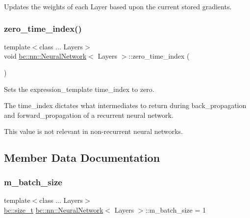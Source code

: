 Updates the weights of each Layer based upon the current stored gradients. 

\mbox{\label{structbc_1_1nn_1_1NeuralNetwork_aead05a9cd78bf9f495c0bcd6ea723bd6}} 
\subsubsection{\texorpdfstring{zero\+\_\+time\+\_\+index()}{zero\_time\_index()}}
{\footnotesize\ttfamily template$<$class ... Layers$>$ \\
void \hyperlink{structbc_1_1nn_1_1NeuralNetwork}{bc\+::nn\+::\+Neural\+Network}$<$ Layers $>$\+::zero\+\_\+time\+\_\+index (\begin{DoxyParamCaption}{ }\end{DoxyParamCaption})\hspace{0.3cm}{\ttfamily [inline]}}



Sets the expression\+\_\+template time\+\_\+index to zero. 

The time\+\_\+index dictates what intermediates to return during back\+\_\+propagation and forward\+\_\+propagation of a recurrent neural network.

This value is not relevant in non-\/recurrent neural networks. 

\subsection{Member Data Documentation}
\mbox{\label{structbc_1_1nn_1_1NeuralNetwork_a134b5b8e3bd6e52f38801022b3ae36a8}} 
\subsubsection{\texorpdfstring{m\+\_\+batch\+\_\+size}{m\_batch\_size}}
{\footnotesize\ttfamily template$<$class ... Layers$>$ \\
\hyperlink{namespacebc_aaf8e3fbf99b04b1b57c4f80c6f55d3c5}{bc\+::size\+\_\+t} \hyperlink{structbc_1_1nn_1_1NeuralNetwork}{bc\+::nn\+::\+Neural\+Network}$<$ Layers $>$\+::m\+\_\+batch\+\_\+size = 1}

